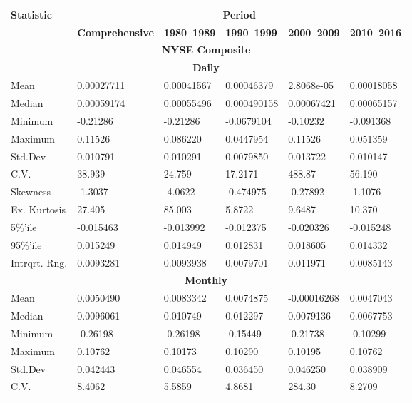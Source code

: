 \documentclass[11pt, english]{article}
\begin{document}
	\begin{center}
		\scriptsize
	\begin{longtable}{p{2cm}p{2cm}p{2cm}p{2cm}p{2cm}p{2cm} }
		\multirow{2}{*}{\textbf{Statistic}} & \multicolumn{5}{c}{\textbf{Period}}\\
		\cline{2-6}
		& \textbf{Comprehensive} & \textbf{1980--1989} & \textbf{1990--1999} & \textbf{2000--2009} & \textbf{2010--2016}\\
		\hline
		\hline
		\multicolumn{6}{c}{\textbf{NYSE Composite}}\\
		\hline
		\hline
		\multicolumn{6}{c}{\textbf{Daily}}\\
		\hline
		Mean & 0.00027711 & 0.00041567 & 0.00046379 & 2.8068e-05 & 0.00018058\\
		Median & 0.00059174 & 0.00055496 & 0.000490158 & 0.00067421 & 0.00065157\\
		Minimum & -0.21286 & -0.21286 & -0.0679104 & -0.10232 & -0.091368\\
		Maximum & 0.11526 & 0.086220 & 0.0447954 & 0.11526 & 0.051359\\
		Std.Dev & 0.010791 & 0.010291 & 0.0079850 & 0.013722 & 0.010147\\ 
		C.V. & 38.939 & 24.759 & 17.2171 & 488.87 & 56.190\\ 
		Skewness & -1.3037 & -4.0622 & -0.474975 & -0.27892 & -1.1076\\ 
		Ex. Kurtosis & 27.405 & 85.003 & 5.8722 & 9.6487 & 10.370\\ 
		5\%’ile & -0.015463 & -0.013992 & -0.012375 & -0.020326 & -0.015248\\ 
		95\%’ile & 0.015249 & 0.014949 & 0.012831 & 0.018605 & 0.014332\\ 
		Intrqrt. Rng. & 0.0093281 & 0.0093938 & 0.0079701 & 0.011971 & 0.0085143\\
		\hline
		\multicolumn{6}{c}{\textbf{Monthly}}\\
		\hline
		Mean & 0.0050490 & 0.0083342 & 0.0074875 & -0.00016268 & 0.0047043\\ 
		Median & 0.0096061 & 0.010749 & 0.012297 & 0.0079136 & 0.0067753\\
		Minimum & -0.26198 & -0.26198 & -0.15449 & -0.21738 & -0.10299\\
		Maximum & 0.10762 & 0.10173 & 0.10290 & 0.10195 & 0.10762\\
		Std.Dev & 0.042443 & 0.046554 & 0.036450 & 0.046250 & 0.038909\\
		C.V. & 8.4062 & 5.5859 & 4.8681 & 284.30 & 8.2709\\

\end{longtable}
\end{center}
\end{document}
